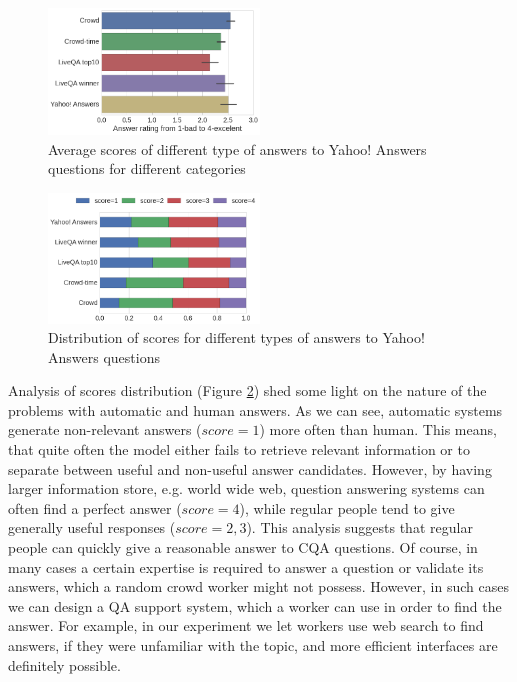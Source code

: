 \documentclass[11pt,letterpaper]{article}
\begin{document}
\begin{figure}[h]
	\centering
	\includegraphics[width=0.5\textwidth]{img/average_score}
	\caption{Average scores of different type of answers to Yahoo! Answers questions for different categories}
	\label{fig:average_score}
\end{figure}

\begin{figure}[h]
	\centering
	\includegraphics[width=0.5\textwidth]{img/scores_distribution}
	\caption{Distribution of scores for different types of answers to Yahoo! Answers questions}
	\label{fig:scores_distribution}
\end{figure}


Analysis of scores distribution (Figure \ref{fig:scores_distribution}) shed some light on the nature of the problems with automatic and human answers.
As we can see, automatic systems generate non-relevant answers ($score=1$) more often than human.
This means, that quite often the model either fails to retrieve relevant information or to separate between useful and non-useful answer candidates.
However, by having larger information store, e.g. world wide web, question answering systems can often find a perfect answer ($score=4$), while regular people tend to give generally useful responses ($score=2,3$).
This analysis suggests that regular people can quickly give a reasonable answer to CQA questions.
Of course, in many cases a certain expertise is required to answer a question or validate its answers, which a random crowd worker might not possess.
However, in such cases we can design a QA support system, which a worker can use in order to find the answer.
For example, in our experiment we let workers use web search to find answers, if they were unfamiliar with the topic, and more efficient interfaces are definitely possible.
\end{document}
